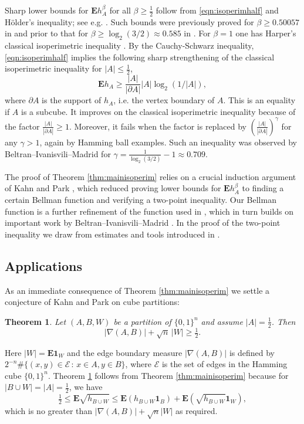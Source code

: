 \documentclass[11pt]{amsart}
\theoremstyle{plain}
\newtheorem{thm}{Theorem}[section]
\theoremstyle{definition}
\theoremstyle{remark}
\numberwithin{equation}{section}
\begin{document}
Sharp lower bounds for $\mathbf{E} h_A^\beta$ for all $\beta\ge \frac12$ follow from \eqref{eqn:isoperimhalf} and H\"older's inequality; see e.g. \cite[Lemma 5.1]{DIR24}.
Such bounds were previously proved for $\beta\ge 0.50057$ in \cite{DIR24} and prior to that for $\beta\ge \log_2(3/2)\approx 0.585$ in \cite{KP20,BIM23}.
For $\beta=1$ one has Harper's classical isoperimetric inequality \cite{Har66,Ber67,Hart76}.
By the Cauchy-Schwarz inequality, \eqref{eqn:isoperimhalf} implies the following sharp strengthening of the classical isoperimetric inequality for $|A|\le \frac12$,
\begin{equation}\label{eqn:classicalsharpening}
\mathbf{E} h_A \ge \frac{|A|}{|\partial A|} |A|\log_2(1/|A|),
\end{equation}
where $\partial A$ is the support of $h_A$, i.e. the vertex boundary of $A$.
This is an equality if $A$ is a subcube. It improves on the classical isoperimetric inequality because of the factor $\frac{|A|}{|\partial A|}\ge 1$. Moreover, it fails when the factor is replaced by $(\frac{|A|}{|\partial A|})^{\gamma}$ for any $\gamma>1$, again by Hamming ball examples.
Such an inequality was observed by Beltran--Ivanisvili--Madrid \cite[Cor. 1.2]{BIM23} for $\gamma=\frac1{\log_2 (3/2)}-1\approx 0.709$.

The proof of Theorem \ref{thm:mainisoperim} relies on a crucial induction argument of Kahn and Park \cite{KP20}, which reduced proving lower bounds for $\mathbf{E} h_A^\beta$ to finding a certain Bellman function and verifying a two-point inequality.
Our Bellman function is a further refinement of the function used in \cite{DIR24}, which in turn builds on important work by Beltran--Ivanisvili--Madrid \cite{BIM23}.
In the proof of the two-point inequality we draw from estimates and tools introduced in \cite{DIR24}.

\subsection*{Applications}
As an immediate consequence of Theorem \ref{thm:mainisoperim} we settle a conjecture of Kahn and Park \cite[Conjecture 1.3]{KP20} on cube partitions:
\begin{thm}\label{cor:kahnpark}
Let $(A,B,W)$ be a partition of $\{0,1\}^n$ and assume $|A|=\frac12$. Then
\[ |\nabla(A,B)| + \sqrt{n}\,|W|\ge \tfrac12. \]
\end{thm}
Here $|W|=\mathbf{E} \mathbf{1}_W$ and the edge boundary measure $|\nabla(A,B)|$ is defined by $2^{-n} \# \{(x,y)\in \mathcal{E}\,:\,x\in A, y\in B\}$, where $\mathcal{E}$ is the set of edges in the Hamming cube $\{0,1\}^n$.
Theorem \ref{cor:kahnpark} follows from Theorem \ref{thm:mainisoperim} because for $|B\cup W|=|A|=\frac12$, we have
\[\tfrac12\le \mathbf{E} \sqrt{h_{B\cup W}} \le \mathbf{E} (h_{B\cup W}\mathbf{1}_B) + \mathbf{E} (\sqrt{h_{B\cup W}}\mathbf{1}_W),\]
which is no greater than $|\nabla(A,B)| + \sqrt{n} |W|$ as required.
\end{document}
